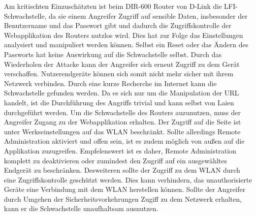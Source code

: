 	Am kritischten Einzuschätzten ist beim DIR-600 Router von D-Link die LFI-Schwachstelle, da sie 
	einem Angreifer Zugriff auf sensible Daten, insbesonder der Benutzername und das 
	Passwort gibt und dadurch die Zugriffskontrolle der Webapplikation des Routers nutzlos wird.
	Dies hat zur Folge das Einstellungen analysiert und manipuliert werden können.
	Selbst ein Reset oder das Ändern des Passworts hat keine Auswirkung auf die 
	Schwachstelle selbst. Durch das Wiederholen der Attacke kann der Angreifer sich erneut 
	Zugriff zu dem Gerät verschaffen.
	Nutzerendgeräte können sich somit nicht mehr sicher mit ihrem Netzwerk verbinden.
	Durch eine kurze Recherche im Internet kann die Schwachstelle gefunden werden.
	Da es sich nur um die Manipulation der URL handelt, ist die Durchführung 
	des Angriffs trivial und kann selbst von Laien durchgeführt werden.
	Um die Schwachstelle des Routers auzunutzen, muss der Angreifer Zugang zu der
	Webapplikation erhalten. Der Zugriff auf die Seite ist unter Werkseinstellungen 
	auf das WLAN beschränkt. Sollte allerdings Remote Administration aktiviert und offen
	sein, ist es zudem möglich von außen auf die Applikation zuzugreifen.
	Empfelenswert ist es daher, Remote Administration komplett zu deaktivieren oder
	zumindest den Zugriff auf ein ausgewähltes Endgerät zu beschränken.
	Desweiteren sollte der Zugriff zu dem WLAN durch eine Zugriffskontrolle
	geschützt werden. Dies kann verhindern, das unauthorisierte Geräte eine
	Verbindung mit dem WLAN herstellen können.
	Sollte der Angreifer durch Umgehen der Sicherheitsvorkehrungen Zugiff zu dem
	Netzwerk erhalten, kann er die Schwachstelle unaufhaltsam ausnutzen.
	






